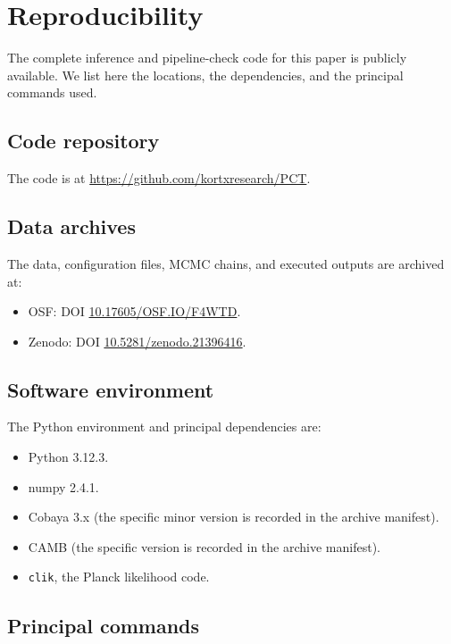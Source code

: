 ﻿\documentclass[12pt,a4paper]{article}
\theoremstyle{definition}
\begin{document}
\section{Reproducibility}
\label{app:reproducibility}

The complete inference and pipeline-check code for this paper is publicly available. We list here the locations, the dependencies, and the principal commands used.

\subsection{Code repository}

The code is at \url{https://github.com/kortxresearch/PCT}.

\subsection{Data archives}

The data, configuration files, MCMC chains, and executed outputs are archived at:
\begin{itemize}
  \item OSF: DOI \href{https://doi.org/10.17605/OSF.IO/F4WTD}{10.17605/OSF.IO/F4WTD}.
  \item Zenodo: DOI \href{https://doi.org/10.5281/zenodo.21396416}{10.5281/zenodo.21396416}.
\end{itemize}

\subsection{Software environment}

The Python environment and principal dependencies are:
\begin{itemize}
  \item Python 3.12.3.
  \item numpy 2.4.1.
  \item Cobaya 3.x (the specific minor version is recorded in the archive manifest).
  \item CAMB (the specific version is recorded in the archive manifest).
  \item \texttt{clik}, the Planck likelihood code.
\end{itemize}

\subsection{Principal commands}
\end{document}
